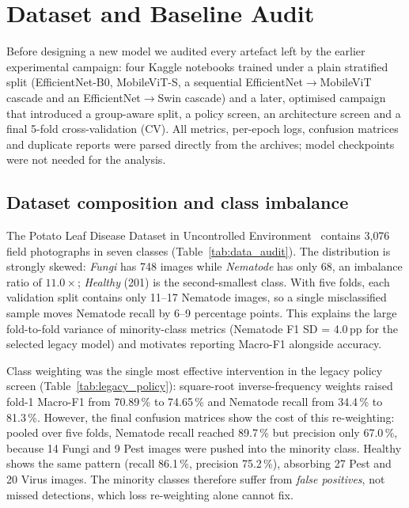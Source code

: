 \section{Dataset and Baseline Audit}
\label{sec:baseline_audit}

Before designing a new model we audited every artefact left by the earlier
experimental campaign: four Kaggle notebooks trained under a plain stratified
split (EfficientNet-B0, MobileViT-S, a sequential EfficientNet$\rightarrow$MobileViT
cascade and an EfficientNet$\rightarrow$Swin cascade) and a later, optimised
campaign that introduced a group-aware split, a policy screen, an architecture
screen and a final 5-fold cross-validation (CV). All metrics, per-epoch logs,
confusion matrices and duplicate reports were parsed directly from the archives;
model checkpoints were not needed for the analysis.

\subsection{Dataset composition and class imbalance}
\label{sec:audit_imbalance}

The Potato Leaf Disease Dataset in Uncontrolled Environment~\cite{shabrina2024dataset} contains
3{,}076 field photographs in seven classes (Table~\ref{tab:data_audit}).
The distribution is strongly skewed: \emph{Fungi} has 748 images while
\emph{Nematode} has only 68, an imbalance ratio of $11.0\times$; \emph{Healthy}
(201) is the second-smallest class. With five folds, each validation split
contains only 11--17 Nematode images, so a single misclassified sample moves
Nematode recall by 6--9 percentage points. This explains the large fold-to-fold
variance of minority-class metrics (Nematode F1 SD = 4.0\,pp for the selected
legacy model) and motivates reporting Macro-F1 alongside accuracy.



Class weighting was the single most effective intervention in the legacy policy
screen (Table~\ref{tab:legacy_policy}): square-root inverse-frequency weights
raised fold-1 Macro-F1 from 70.89\,\% to 74.65\,\% and Nematode recall from
34.4\,\% to 81.3\,\%. However, the final confusion matrices show the cost of this
re-weighting: pooled over five folds, Nematode recall reached 89.7\,\% but
precision only 67.0\,\%, because 14 Fungi and 9 Pest images were pushed into the
minority class. Healthy shows the same pattern (recall 86.1\,\%, precision
75.2\,\%), absorbing 27 Pest and 20 Virus images. The minority classes therefore
suffer from \emph{false positives}, not missed detections, which loss re-weighting
alone cannot fix.

